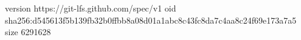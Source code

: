 version https://git-lfs.github.com/spec/v1
oid sha256:d545613f5b139fb32b0ffbb8a08d01a1abc8c43fc8da7c4aa8c24f69e173a7a5
size 6291628
